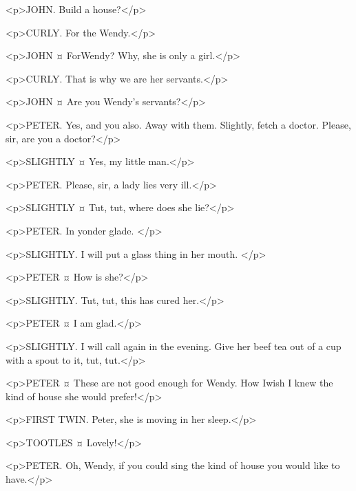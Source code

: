 <p>JOHN. Build a house?</p>

<p>CURLY. For the Wendy.</p>

<p>JOHN ¤
ForWendy? Why, she is only a girl.</p>

<p>CURLY. That is why we are her servants.</p>

<p>JOHN ¤
Are you Wendy's servants?</p>

<p>PETER. Yes, and you also. Away with them.
Slightly, fetch a doctor.
Please, sir, are you a doctor?</p>

<p>SLIGHTLY ¤
Yes, my little man.</p>

<p>PETER. Please, sir, a lady lies very ill.</p>

<p>SLIGHTLY ¤
Tut, tut, where does she lie?</p>

<p>PETER. In yonder glade.
</p>

<p>SLIGHTLY. I will put a glass thing in her mouth.
</p>

<p>PETER ¤
How is she?</p>

<p>SLIGHTLY. Tut, tut, this has cured her.</p>

<p>PETER ¤
I am glad.</p>

<p>SLIGHTLY. I will call again in the evening. Give her beef tea out of a cup with a spout to it, tut, tut.</p>


<p>PETER ¤
These are not good enough for Wendy. How Iwish I knew the kind of house she would prefer!</p>

<p>FIRST TWIN. Peter, she is moving in her sleep.</p>

<p>TOOTLES ¤
Lovely!</p>

<p>PETER. Oh, Wendy, if you could sing the kind of house you would like to have.</p>

